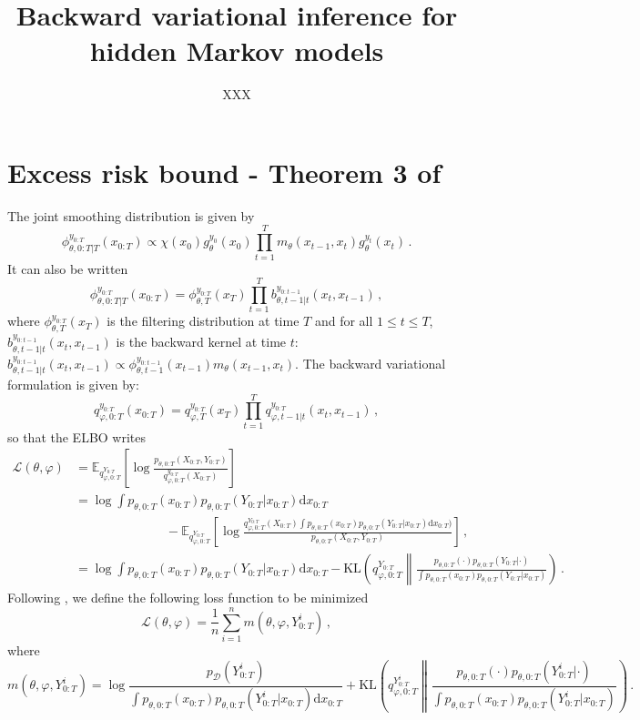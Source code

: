 \documentclass{article}
\title{Backward variational inference for hidden Markov models}
\date{}
\author[$\dag$]{XXX}
\affil[$\dag$]{{\small }}
\newcommand{\1}{\mathbbm{1}}
\newcommand{\rmd}{\ensuremath{\mathrm{d}}}
\begin{document}
\maketitle

\begin{abstract}

\end{abstract}



\section{Excess risk bound - Theorem 3 of \cite{tang21a}}
The joint smoothing distribution is given by
$$
\phi^{y_{0:T}}_{\theta,0:T|T}(x_{0:T}) \propto \chi(x_{0})g_\theta^{y_0}(x_0) \prod_{t=1}^Tm_\theta(x_{t-1},x_t)g_\theta^{y_t}(x_t)\,.
$$
It can also be written
$$
\phi^{y_{0:T}}_{\theta,0:T|T}(x_{0:T}) = \phi^{y_{0:T}}_{\theta,T}(x_{T}) \prod_{t=1}^Tb^{y_{0:t-1}}_{\theta,t-1|t}(x_t,x_{t-1})\,,
$$
where $\phi^{y_{0:T}}_{\theta,T}(x_{T})$ is the filtering distribution at time $T$ and for all $1\leq t \leq T$, $b^{y_{0:t-1}}_{\theta,t-1|t}(x_t,x_{t-1})$ is the backward kernel at time $t$: $b^{y_{0:t-1}}_{\theta,t-1|t}(x_t,x_{t-1})\propto \phi^{y_{0:t-1}}_{\theta,t-1}(x_{t-1})m_\theta(x_{t-1},x_t)$. The backward variational formulation is given by:
$$
q_{\varphi,0:T}^{y_{0:T}}(x_{0:T}) = q_{\varphi,T}^{y_{0:T}}(x_T)\prod_{t=1}^Tq^{y_{0:T}}_{\varphi,t-1|t}(x_t,x_{t-1})\,,
$$
so that the ELBO writes
\begin{align*}
\mathcal{L}(\theta,\varphi) &= \mathbb{E}_{q^{Y_{0:T}}_{\varphi,0:T}}\left[\log \frac{p_{\theta,0:T}(X_{0:T},Y_{0:T})}{q^{y_{0:T}}_{\varphi,0:T}(X_{0:T})}\right]\\
&= \log \int p_{\theta,0:T}(x_{0:T})p_{\theta,0:T}(Y_{0:T}|x_{0:T}) \rmd x_{0:T}\\
&\hspace{3cm}-\mathbb{E}_{q^{Y_{0:T}}_{\varphi,0:T}}\left[\log \frac{q^{Y_{0:T}}_{\varphi,0:T}(X_{0:T})\int p_{\theta,0:T}(x_{0:T})p_{\theta,0:T}(Y_{0:T}|x_{0:T})\rmd x_{0:T})}{p_{\theta,0:T}(X_{0:T},Y_{0:T})}\right]\,,\\
&= \log \int p_{\theta,0:T}(x_{0:T})p_{\theta,0:T}(Y_{0:T}|x_{0:T}) \rmd x_{0:T}- \mathrm{KL}\left(q^{Y_{0:T}}_{\varphi,0:T}\middle\| \frac{p_{\theta,0:T}(\cdot)p_{\theta,0:T}(Y_{0:T}|\cdot)}{\int p_{\theta,0:T}(x_{0:T})p_{\theta,0:T}(Y_{0:T}|x_{0:T})}\right)\,.
\end{align*}
Following \cite{tang21a}, we define the following loss function to be minimized
$$
\mathcal{L}(\theta,\varphi) = \frac{1}{n}\sum_{i=1}^nm(\theta,\varphi,Y^i_{0:T})\,,
$$
where
$$
m(\theta,\varphi,Y^i_{0:T}) = \log \frac{p_{\mathcal{D}}(Y^i_{0:T})}{\int p_{\theta,0:T}(x_{0:T})p_{\theta,0:T}(Y^i_{0:T}|x_{0:T}) \rmd x_{0:T}} + \mathrm{KL}\left(q^{Y^i_{0:T}}_{\varphi,0:T}\middle\| \frac{p_{\theta,0:T}(\cdot)p_{\theta,0:T}(Y^i_{0:T}|\cdot)}{\int p_{\theta,0:T}(x_{0:T})p_{\theta,0:T}(Y^i_{0:T}|x_{0:T})}\right)\,.
$$
\end{document}
